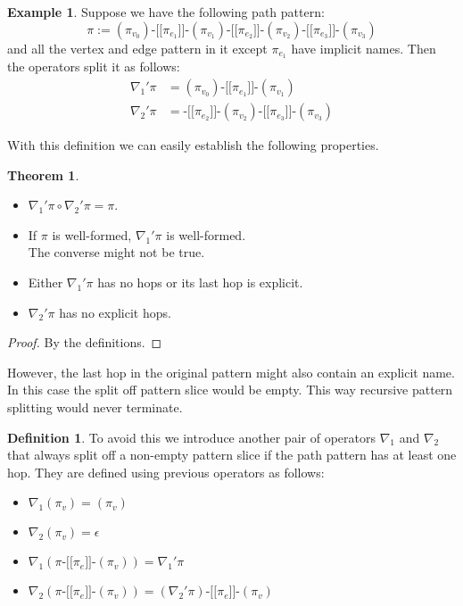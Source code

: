 \documentclass[14pt]{constructor-thesis}
\theoremstyle{definition}
\newtheorem{theorem}{Theorem}
\newtheorem{definition}{Definition}
\newtheorem{example}{Example}
\newcommand{\patternstart}[1]{(#1)}
\newcommand{\patternhop}[3]{#1 \texttt{-[[} #2 \texttt{]]-} (#3)}
\begin{document}
\begin{example}
  Suppose we have the following path pattern:
  $$ \pi := \patternhop{\patternhop{
    \patternhop{\patternstart{\pi_{v_0}}}{\pi_{e_1}}{\pi_{v_1}}
    }{\pi_{e_2}}{\pi_{v_2}}}{{\pi_{e_3}}}{\pi_{v_3}} $$
  and all the vertex and edge pattern in it except $\pi_{e_1}$ have implicit names. Then the operators split it as follows:
  \begin{align*}
    \nabla_1' \pi &= \patternhop{\patternstart{\pi_{v_0}}}{\pi_{e_1}}{\pi_{v_1}} \\
    \nabla_2' \pi &= \patternhop{\patternhop{}{\pi_{e_2}}{\pi_{v_2}}}{\pi_{e_3}}{\pi_{v_3}}
  \end{align*}
\end{example}

With this definition we can easily establish the following properties.

\begin{theorem} $ $

  \begin{itemize}
    \item $\nabla_1' \pi \circ \nabla_2' \pi = \pi$.
    \item If $\pi$ is well-formed, $\nabla_1' \pi$ is well-formed. \\
    The converse might not be true.
    \item Either $\nabla_1' \pi$ has no hops or its last hop is explicit.
    \item $\nabla_2' \pi$ has no explicit hops.
  \end{itemize}
\end{theorem}
\begin{proof}
  By the definitions.
\end{proof}

However, the last hop in the original pattern might also contain an explicit name. In this case the split off pattern slice would be empty. This way recursive pattern splitting would never terminate.

\begin{definition}
  To avoid this we introduce another pair of operators $\nabla_1$ and $\nabla_2$ that always split off a non-empty pattern slice if the path pattern has at least one hop. They are defined using previous operators as follows:
  \begin{itemize}
    \item $\nabla_1 \patternstart{\pi_v} = \patternstart{\pi_v}$
    \item $\nabla_2 \patternstart{\pi_v} = \epsilon$
    \item $\nabla_1 (\patternhop{\pi}{\pi_e}{\pi_v}) = \nabla_1' \pi$
    \item $\nabla_2 (\patternhop{\pi}{\pi_e}{\pi_v}) = \patternhop{(\nabla_2' \pi)}{\pi_e}{\pi_v} $
  \end{itemize}
\end{definition}
\end{document}
